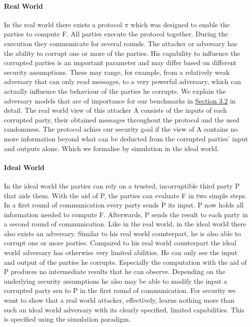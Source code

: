 \paragraph{Real World}
In the real world there exists a protocol $\pi $ which was designed to enable the parties to compute F. All parties execute the protocol together. During the execution they communicate for several rounds. The attacker or adversary has the ability to corrupt one or more of the parties. His capability to influence the corrupted parties is an important parameter and may differ based on different security assumptions. These may range, for example, from a relatively weak adversary that can only read messages, to a very powerful adversary, which can actually influence the behaviour of the parties he corrupts. We explain the adversary models that are of importance for our benchmarks in \hyperref[sec:Adversarial Models]{Section 3.2} in detail.
The real world view of this attacker A consists of the inputs of each corrupted party, their obtained messages throughout the protocol and the used randomness. The protocol achies our security goal if the view of A contains no more information beyond what can be deducted from the corrupted parties' input and outputs alone. Which we formalise by simulation in the ideal world. 
\paragraph{Ideal World}%
In the ideal world the parties can rely on a trusted, incorruptible third party P that aids them. With the aid of P, the parties can evaluate F in two simple steps. In a first round of communication every party sends P its input. P now holds all information needed to compute F. Afterwards, P sends the result to each party in a second round of communication. Like in the real world, in the ideal world there also exists an adversary. Similar to his real world counterpart, he is also able to corrupt one or more parties. Compared to his real world counterpart the ideal world adversary has otherwise very limited abilities. He can only see the input and output of the parties he corrupts. Especially the computation with the aid of P produces no intermediate results that he can observe. Depending on the underlying security assumptions he also may be able to modify the input a corrupted party sen to P in the first round of communication. For security we want to show that a real world attacker, effectively, learns nothing more than such an ideal world adversary with its clearly specified, limited capabilities. This is specified using the simulation paradigm.

